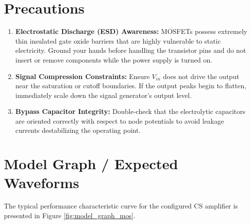 \section{Precautions}
\begin{enumerate}
	\item \textbf{Electrostatic Discharge (ESD) Awareness:} MOSFETs possess extremely thin insulated gate oxide barriers that are highly vulnerable to static electricity. Ground your hands before handling the transistor pins and do not insert or remove components while the power supply is turned on.
	\item \textbf{Signal Compression Constraints:} Ensure $V_{in}$ does not drive the output near the saturation or cutoff boundaries. If the output peaks begin to flatten, immediately scale down the signal generator's output level.
	\item \textbf{Bypass Capacitor Integrity:} Double-check that the electrolytic capacitors are oriented correctly with respect to node potentials to avoid leakage currents destabilizing the operating point.
\end{enumerate}

\section{Model Graph / Expected Waveforms}
The typical performance characteristic curve for the configured CS amplifier is presented in Figure \ref{fig:model_graph_mos}.

